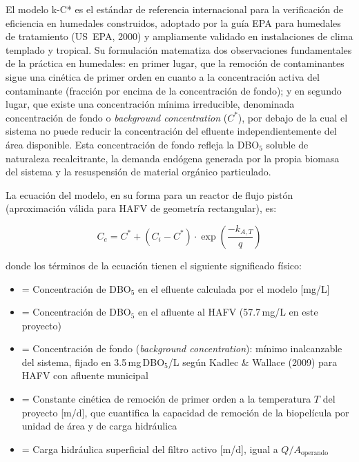 \documentclass[12pt,a4paper]{article}
\begin{document}
El modelo k-C* es el estándar de referencia internacional para la verificación de eficiencia en humedales construidos, adoptado por la guía EPA para humedales de tratamiento (US~EPA, 2000) y ampliamente validado en instalaciones de clima templado y tropical. Su formulación matematiza dos observaciones fundamentales de la práctica en humedales: en primer lugar, que la remoción de contaminantes sigue una cinética de primer orden en cuanto a la concentración activa del contaminante (fracción por encima de la concentración de fondo); y en segundo lugar, que existe una concentración mínima irreducible, denominada concentración de fondo o \textit{background concentration} ($C^*$), por debajo de la cual el sistema no puede reducir la concentración del efluente independientemente del área disponible. Esta concentración de fondo refleja la DBO$_5$ soluble de naturaleza recalcitrante, la demanda endógena generada por la propia biomasa del sistema y la resuspensión de material orgánico particulado.

La ecuación del modelo, en su forma para un reactor de flujo pistón (aproximación válida para HAFV de geometría rectangular), es:

\begin{equation}
C_e = C^* + (C_i - C^*) \cdot \exp\!\left(\frac{-k_{A,T}}{q}\right)
\label{eq:kC_star}
\end{equation}

donde los términos de la ecuación tienen el siguiente significado físico:

\begin{itemize}[noitemsep,leftmargin=2em]
    \item[$C_e$] = Concentración de DBO$_5$ en el efluente calculada por el modelo [mg/L]
    \item[$C_i$] = Concentración de DBO$_5$ en el afluente al HAFV (57.7\,mg/L en este proyecto)
    \item[$C^*$] = Concentración de fondo (\textit{background concentration}): mínimo inalcanzable del sistema, fijado en 3.5\,mg\,DBO$_5$/L según Kadlec \& Wallace (2009) para HAFV con afluente municipal
    \item[$k_{A,T}$] = Constante cinética de remoción de primer orden a la temperatura $T$ del proyecto [m/d], que cuantifica la capacidad de remoción de la biopelícula por unidad de área y de carga hidráulica
    \item[$q$] = Carga hidráulica superficial del filtro activo [m/d], igual a $Q / A_\text{operando}$
\end{itemize}
\end{document}
